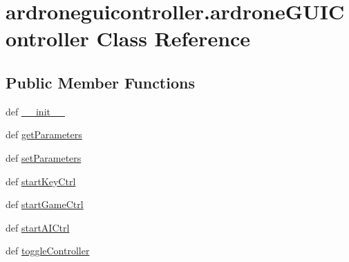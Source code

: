 \hypertarget{classardroneguicontroller_1_1ardroneGUIController}{\section{ardroneguicontroller.\-ardrone\-G\-U\-I\-Controller Class Reference}
\label{classardroneguicontroller_1_1ardroneGUIController}
}
\subsection*{Public Member Functions}
\begin{DoxyCompactItemize}
\item 
def \hyperlink{classardroneguicontroller_1_1ardroneGUIController_a8883cb97aa8b703eef899ce7943cb5d3}{\-\_\-\-\_\-init\-\_\-\-\_\-}
\item 
def \hyperlink{classardroneguicontroller_1_1ardroneGUIController_a678cee2d3e099ef0fb2a174bd4c3b6b5}{get\-Parameters}
\item 
def \hyperlink{classardroneguicontroller_1_1ardroneGUIController_ad952b0aee8a80b550f1309fd171751a5}{set\-Parameters}
\item 
def \hyperlink{classardroneguicontroller_1_1ardroneGUIController_aa420491a69835f08f51d8747fed26503}{start\-Key\-Ctrl}
\item 
def \hyperlink{classardroneguicontroller_1_1ardroneGUIController_a3362d56b369d3bbb0ad6acdd8e959f8c}{start\-Game\-Ctrl}
\item 
def \hyperlink{classardroneguicontroller_1_1ardroneGUIController_a462e63a6341ecddcd326032f242e093c}{start\-A\-I\-Ctrl}
\item 
def \hyperlink{classardroneguicontroller_1_1ardroneGUIController_abe6387ee862a5be226e0b6bbd5f6e8f5}{toggle\-Controller}
\end{DoxyCompactItemize}
